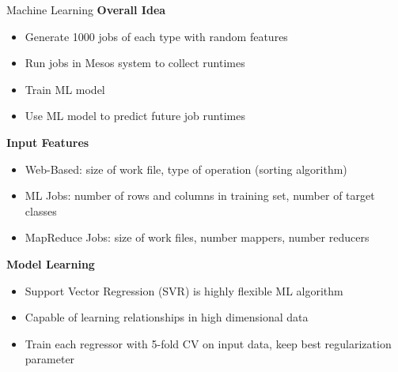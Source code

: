 \documentclass[unknownkeysallowed, final]{beamer}
\begin{document}
\begin{frame}
\begin{columns}[t]
\begin{column}{.34\linewidth}
\vspace{.5cm}
\begin{block}{Machine Learning}
\textbf{Overall Idea}
\begin{itemize}
    \item Generate 1000 jobs of each type with random features
    \item Run jobs in Mesos system to collect runtimes
    \item Train ML model
    \item Use ML model to predict future job runtimes
\end{itemize}
\vspace{.2cm}
\textbf{Input Features}
    \begin{itemize}
        \item Web-Based: size of work file, type of operation (sorting algorithm)
        \item ML Jobs: number of rows and columns in training set, number of target classes
        \item MapReduce Jobs: size of work files, number mappers, number reducers
    \end{itemize}
\vspace{.2cm}
\textbf{Model Learning}
    \begin{itemize}
        \item Support Vector Regression (SVR) is highly flexible ML algorithm
        \item Capable of learning relationships in high dimensional data
        \item Train each regressor with 5-fold CV on input data, keep best regularization parameter
    \end{itemize}
\end{block}



\end{column}
\end{columns}
\end{frame}
\end{document}
